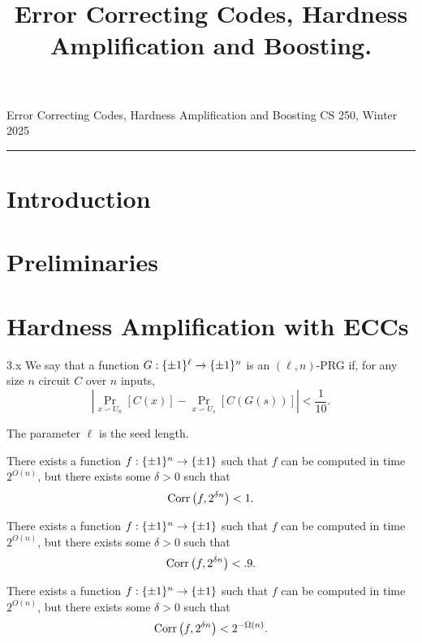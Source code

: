 \documentclass[11pt]{article}
\title{Error Correcting Codes, Hardness Amplification and Boosting.}
\date{}
\begin{document}
    
\noindent Error Correcting Codes, Hardness Amplification and Boosting \hfill  CS 250, Winter 2025\\
\hrule


\section{Introduction}

\tableofcontents


\section{Preliminaries}

\section{Hardness Amplification with ECCs}

\begin{definition}{3.x}
    We say that a function $G : \{\pm 1\}^\ell \rightarrow \{\pm 1\}^{n}$ is an $(\ell, n)$-PRG if, for any size $n$ circuit $C$ over $n$ inputs, 
    \begin{equation*}
        \left|\Pr_{x \backsim U_n}[C(x)] - \Pr_{x \backsim U_s}[C(G(s))]\right| < \frac{1}{10}.
    \end{equation*}
\end{definition}

The parameter $\ell$ is the seed length.

\begin{assumption}{1} \label{a-1}
    There exists a function $f : \{\pm 1\}^n \rightarrow \{\pm 1\}$ such that $f$ can be computed in time $2^{O(n)}$, but there exists some $\delta > 0$ such that 
    \begin{equation*}
        \mathrm{Corr}\left(f, 2^{\delta n}\right) < 1.
    \end{equation*}
\end{assumption}

\begin{assumption}{2} \label{a-2}
    There exists a function $f : \{\pm 1\}^n \rightarrow \{\pm 1\}$ such that $f$ can be computed in time $2^{O(n)}$, but there exists some $\delta > 0$ such that 
    \begin{equation*}
        \mathrm{Corr}\left(f, 2^{\delta n}\right) < .9.
    \end{equation*}
\end{assumption}

\begin{assumption}{3} \label{a-3}
    There exists a function $f : \{\pm 1\}^n \rightarrow \{\pm 1\}$ such that $f$ can be computed in time $2^{O(n)}$, but there exists some $\delta > 0$ such that 
    \begin{equation*}
        \mathrm{Corr}\left(f, 2^{\delta n}\right) < 2^{-\Omega(n)}.
    \end{equation*}
\end{assumption}
\end{document}
